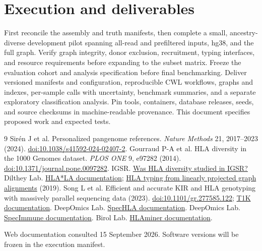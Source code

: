 \documentclass[10pt,a4paper]{article}
\begin{document}
\section{Execution and deliverables}
First reconcile the assembly and truth manifests, then complete a small,
ancestry-diverse development pilot spanning all-read and prefiltered inputs,
hg38, and the full graph. Verify graph integrity, donor exclusion, recruitment,
typing interfaces, and resource requirements before expanding to the subset
matrix. Freeze the evaluation cohort and analysis specification before final
benchmarking. Deliver versioned manifests and configuration, reproducible CWL
workflows, graphs and indexes, per-sample calls with uncertainty, benchmark
summaries, and a separate exploratory classification analysis. Pin tools,
containers, database releases, seeds, and source checksums in machine-readable
provenance. This document specifies proposed work and expected tests.

\begin{thebibliography}{9}\small
{} Sir\'en J et al. Personalized pangenome references.
\emph{Nature Methods} 21, 2017--2023 (2024).
\href{https://doi.org/10.1038/s41592-024-02407-2}{doi:10.1038/s41592-024-02407-2}.
 Gourraud P-A et al. HLA diversity in the 1000 Genomes dataset.
\emph{PLOS ONE} 9, e97282 (2014).
\href{https://doi.org/10.1371/journal.pone.0097282}{doi:10.1371/journal.pone.0097282}.
 IGSR. \href{https://www.internationalgenome.org/faq/was-hla-diversity-studied-in-igsr/}{Was HLA diversity studied in IGSR?}
 Dilthey Lab. \href{https://github.com/DiltheyLab/HLA-LA}{HLA*LA documentation};
\href{https://pmc.ncbi.nlm.nih.gov/articles/PMC6821427/}{HLA typing from linearly projected graph alignments} (2019).
 Song L et al. Efficient and accurate KIR and HLA genotyping with massively parallel sequencing data (2023).
\href{https://doi.org/10.1101/gr.277585.122}{doi:10.1101/gr.277585.122}; \href{https://github.com/mourisl/T1K}{T1K documentation}.
 DeepOmics Lab. \href{https://github.com/deepomicslab/SpecHLA}{SpecHLA documentation}.
 DeepOmics Lab. \href{https://github.com/deepomicslab/SpecImmune}{SpecImmune documentation}.
 Birol Lab. \href{https://github.com/BirolLab/HLAminer}{HLAminer documentation}.
\end{thebibliography}
\noindent\footnotesize Web documentation consulted 15 September 2026. Software versions will be frozen in the execution manifest.
\end{document}
